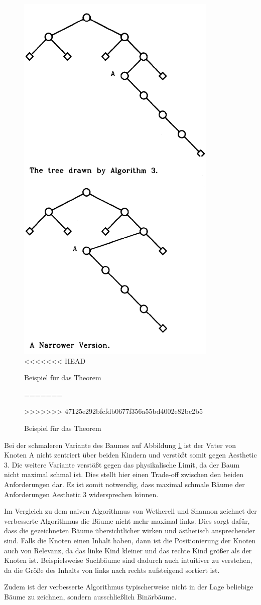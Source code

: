 \begin{figure}[H]
    \centering
    \includegraphics[scale = 0.75]{abbildungen/baum_theorem_uglification}
<<<<<<< HEAD
    \caption{Beispiel für das Theorem \cite[S.519]{q1}}
=======
    \caption{Beispiel für das Theorem \cite[S. 519]{q1}}
>>>>>>> 47125e292bfcfdb0677f356a55bd4002e82bc2b5
    \label{pic:baum_theorem_uglification} 
\end{figure}

Bei der schmaleren Variante des Baumes auf Abbildung \ref{pic:baum_theorem_uglification} ist der Vater von Knoten A nicht zentriert
über beiden Kindern und verstößt somit gegen Aesthetic 3. Die weitere Variante verstößt gegen das physikalische Limit, da der Baum nicht
maximal schmal ist. Dies stellt hier einen Trade-off zwischen den beiden Anforderungen dar. Es ist somit notwendig, dass maximal schmale Bäume der
Anforderungen Aesthetic 3 widersprechen können. 

Im Vergleich zu dem naiven Algorithmus von Wetherell und Shannon zeichnet der verbesserte Algorithmus die Bäume nicht mehr maximal links.
Dies sorgt dafür, dass die gezeichneten Bäume übersichtlicher wirken und ästhetisch ansprechender sind. Falls die Knoten einen Inhalt haben, dann
ist die Positionierung der Knoten auch von Relevanz, da das linke Kind kleiner und das rechte Kind größer als der Knoten ist. Beispielsweise
Suchbäume sind dadurch auch intuitiver zu verstehen, da die Größe des Inhalts von links nach rechts aufsteigend sortiert ist. 

Zudem ist der verbesserte Algorithmus typischerweise nicht in der Lage beliebige Bäume zu zeichnen, sondern ausschließlich Binärbäume.
